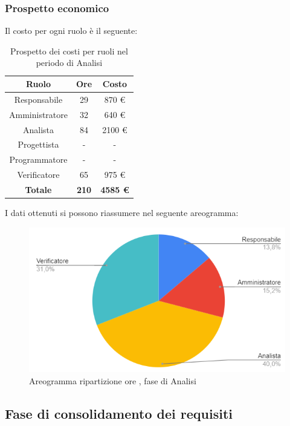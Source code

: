 \subsubsection{Prospetto economico}
Il costo per ogni ruolo è il seguente:
\begin{table}[H]
		\begin{center}
			\setlength{\aboverulesep}{0pt}
			\setlength{\belowrulesep}{0pt}
			\setlength{\extrarowheight}{.75ex}
			\begin{tabular}{ c c c }
				\rowcolor{AzzurroGruppo!30} 
				\textbf{Ruolo} & \textbf{Ore} & \textbf{Costo}  \\
				\toprule
				Responsabile & 29 & 870 \euro \\
				Amministratore & 32 & 640 \euro \\
				Analista & 84 & 2100 \euro \\
				Progettista & - & - \\
				Programmatore & - & - \\
				Verificatore & 65 & 975 \euro \\
				\textbf{Totale} & \textbf{210} & \textbf{4585 \euro} \\
				\bottomrule
			\end{tabular}
			\caption{ Prospetto dei costi per ruoli nel periodo di Analisi}
		\end{center}
\end{table}
I dati ottenuti si possono riassumere nel seguente areogramma:
\begin{figure}[H]
    \centering
    \includegraphics[scale = 0.5]{components/img/analisi_torta.png}
    \caption{ Areogramma ripartizione ore , fase di Analisi}
    \label{fig:Areogramma ripartizione ore , fase di Analisi}
\end{figure}
\subsection{Fase di consolidamento dei requisiti}
